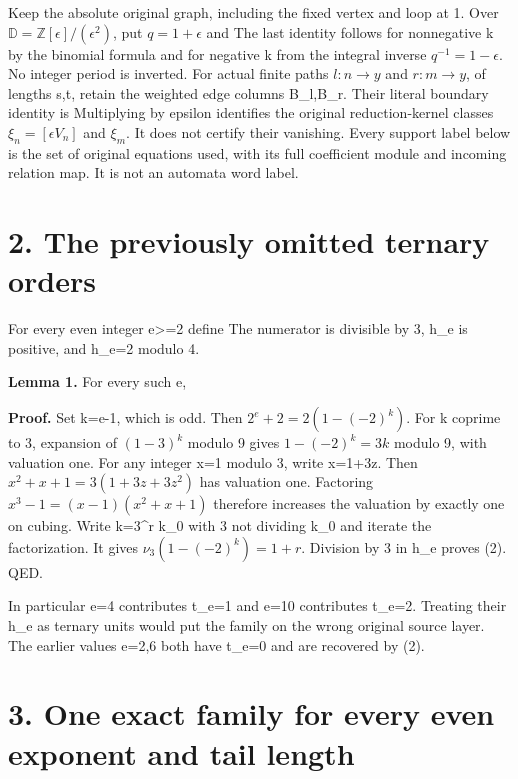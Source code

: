 Keep the absolute original graph, including the fixed vertex and loop at
1. Over \(\mathbb D=\mathbb Z[\epsilon]/(\epsilon^2)\), put
\(q=1+\epsilon\) and
The last identity follows for nonnegative k by the binomial formula and
for negative k from the integral inverse \(q^{-1}=1-\epsilon\). No
integer period is inverted. For actual finite paths \(l:n\to y\) and
\(r:m\to y\), of lengths s,t, retain the weighted edge columns
B\_l,B\_r. Their literal boundary identity is
Multiplying by epsilon identifies the original reduction-kernel classes
\(\xi_n=[\epsilon V_n]\) and \(\xi_m\). It does not certify their
vanishing. Every support label below is the set of original equations
used, with its full coefficient module and incoming relation map. It is
not an automata word label.

\section{2. The previously omitted ternary orders}

For every even integer e\textgreater=2 define
 The numerator
is divisible by 3, h\_e is positive, and h\_e=2 modulo 4.

\textbf{Lemma 1.} For every such e,

\textbf{Proof.} Set k=e-1, which is odd. Then \(2^e+2=2(1-(-2)^k)\). For
k coprime to 3, expansion of \((1-3)^k\) modulo 9 gives \(1-(-2)^k=3k\)
modulo 9, with valuation one. For any integer x=1 modulo 3, write
x=1+3z. Then \(x^2+x+1=3(1+3z+3z^2)\) has valuation one. Factoring
\(x^3-1=(x-1)(x^2+x+1)\) therefore increases the valuation by exactly
one on cubing. Write k=3\^{}r k\_0 with 3 not dividing k\_0 and iterate
the factorization. It gives \(\nu_3(1-(-2)^k)=1+r\). Division by 3 in
h\_e proves (2). QED.

In particular e=4 contributes t\_e=1 and e=10 contributes t\_e=2.
Treating their h\_e as ternary units would put the family on the wrong
original source layer. The earlier values e=2,6 both have t\_e=0 and are
recovered by (2).

\section{3. One exact family for every even exponent and tail length}

